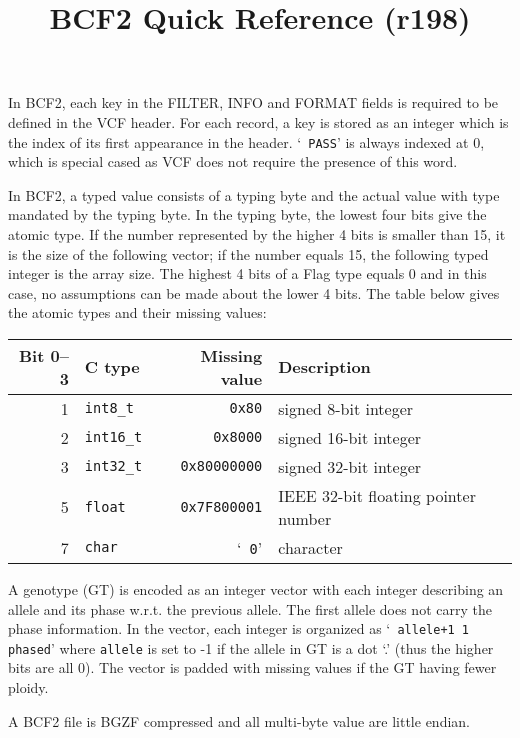 \documentclass[10pt]{article}
\title{BCF2 Quick Reference (r198)}
\author{}
\date{}
\begin{document}
\maketitle

{\small
In BCF2, each key in the {\sf FILTER}, {\sf INFO} and {\sf FORMAT} fields is
required to be defined in the VCF header. For each record, a key is stored as
an integer which is the index of its first appearance in the header. `{\tt
PASS}' is always indexed at 0, which is special cased as VCF does not require
the presence of this word.

In BCF2, a typed value consists of a typing byte and the actual value with type
mandated by the typing byte. In the typing byte, the lowest four bits give the
atomic type. If the number represented by the higher 4 bits is smaller than 15,
it is the size of the following vector; if the number equals 15, the following
typed integer is the array size. The highest 4 bits of a {\sf Flag} type equals
0 and in this case, no assumptions can be made about the lower 4 bits. The
table below gives the atomic types and their
missing values:
\begin{center}
{\small\begin{tabular}{rlrl}
\hline
Bit 0--3 & C type & Missing value & Description \\
\hline
1 & {\tt int8\_t}   & {\tt 0x80}               & signed 8-bit integer \\
2 & {\tt int16\_t}  & {\tt 0x8000}             & signed 16-bit integer \\
3 & {\tt int32\_t}  & {\tt 0x80000000}         & signed 32-bit integer \\
5 & {\tt float}     & {\tt 0x7F800001}         & IEEE 32-bit floating pointer number \\
7 & {\tt char}      & `{\tt \char92 0}'        & character \\
\hline
\end{tabular}}
\end{center}

A genotype (GT) is encoded as an integer vector with each integer
describing an allele and its phase w.r.t. the previous allele. The first allele
does not carry the phase information. In the vector, each integer is organized
as `{\tt {} allele+1 1 phased}' where
{\tt allele} is set to -1 if the allele in GT is a dot `.' (thus the higher
bits are all 0). The vector is padded with missing values if the GT having fewer ploidy.

A BCF2 file is BGZF compressed and all multi-byte value are little endian.
}
\end{document}
